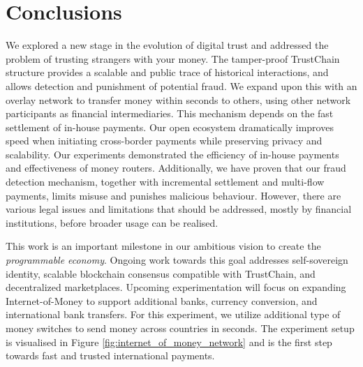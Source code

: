 \section{Conclusions}
We explored a new stage in the evolution of digital trust and addressed the problem of trusting strangers with your money.
The tamper-proof TrustChain structure provides a scalable and public trace of historical interactions, and allows detection and punishment of potential fraud.
We expand upon this with an overlay network to transfer money within seconds to others, using other network participants as financial intermediaries.
This mechanism depends on the fast settlement of in-house payments.
Our open ecosystem dramatically improves speed when initiating cross-border payments while preserving privacy and scalability.
Our experiments demonstrated the efficiency of in-house payments and effectiveness of money routers.
Additionally, we have proven that our fraud detection mechanism, together with incremental settlement and multi-flow payments, limits misuse and punishes malicious behaviour.
However, there are various legal issues and limitations that should be addressed, mostly by financial institutions, before broader usage can be realised.

This work is an important milestone in our ambitious vision to create the \emph{programmable economy}.
Ongoing work towards this goal addresses self-sovereign identity, scalable blockchain consensus compatible with TrustChain, and decentralized marketplaces.
Upcoming experimentation will focus on expanding Internet-of-Money to support additional banks, currency conversion, and international bank transfers.
For this experiment, we utilize additional type of money switches to send money across countries in seconds.
The experiment setup is visualised in Figure \ref{fig:internet_of_money_network} and is the first step towards fast and trusted international payments.